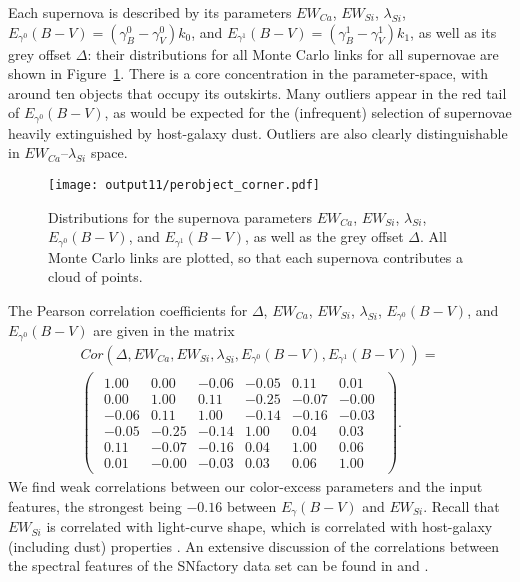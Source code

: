 \documentclass{aastex61}   	%
\begin{document}
Each supernova is described by its parameters $EW_{Ca}$, $EW_{Si}$, $\lambda_{Si}$, $E_{\gamma^0}(B-V)=(\gamma^0_B-\gamma^0_V)k_0$, and
$E_{\gamma^1}(B-V)=(\gamma^1_B-\gamma^1_V)k_1$, as well as its grey offset
$\Delta$: their distributions for all Monte Carlo links for all supernovae are shown in Figure~\ref{perobject:fig}.
There is a core concentration in the  parameter-space, with around ten objects that occupy its outskirts.
Many outliers appear in the red tail of $E_{\gamma^0}(B-V)$, as would be expected for the (infrequent) selection of supernovae
heavily extinguished by host-galaxy dust.
Outliers  are also clearly distinguishable in  $EW_{Ca}$--$\lambda_{Si}$ space.

\begin{figure}[htbp] %
   \centering
   \texttt{[image: output11/perobject\_corner.pdf]} 
   \caption{Distributions for the supernova parameters $EW_{Ca}$, $EW_{Si}$, $\lambda_{Si}$, $E_{\gamma^0}(B-V)$, and $E_{\gamma^1}(B-V)$, as well as the grey offset
$\Delta$.  All Monte Carlo links are plotted, so that each supernova contributes a cloud of points.
   \label{perobject:fig}}
\end{figure}

The Pearson correlation coefficients for $\Delta$, $EW_{Ca}$, $EW_{Si}$, $\lambda_{Si}$, $E_{\gamma^0}(B-V)$, and $E_{\gamma^0}(B-V)$ are given in the matrix
\begin{multline}
Cor(\Delta, EW_{Ca}, EW_{Si}, \lambda_{Si}, E_{\gamma^0}(B-V), E_{\gamma^1}(B-V)) =\\
\begin{pmatrix}
\begin{array}{rrrrrr}
1.00 & 0.00 & -0.06 & -0.05 & 0.11 & 0.01 \\
0.00 & 1.00 & 0.11 & -0.25 & -0.07 & -0.00 \\
-0.06 & 0.11 & 1.00 & -0.14 & -0.16 & -0.03 \\
-0.05 & -0.25 & -0.14 & 1.00 & 0.04 & 0.03 \\
0.11 & -0.07 & -0.16 & 0.04 & 1.00 & 0.06 \\
0.01 & -0.00 & -0.03 & 0.03 & 0.06 & 1.00
\end{array}
\end{pmatrix}.
\end{multline}
We find weak correlations between our color-excess parameters and the input features, the strongest being $-0.16$ between
$E_\gamma(B-V)$ and $EW_{Si}$.
Recall that $EW_{Si}$ is correlated with light-curve shape, which is correlated with host-galaxy (including dust) properties 
\citep{2000AJ....120.1479H, 2003MNRAS.340.1057S}.
An extensive discussion of the correlations between the spectral features of the SNfactory data set can be found in \citet{chotard:thesis}
and \citet{leget:thesis}.
\end{document}
